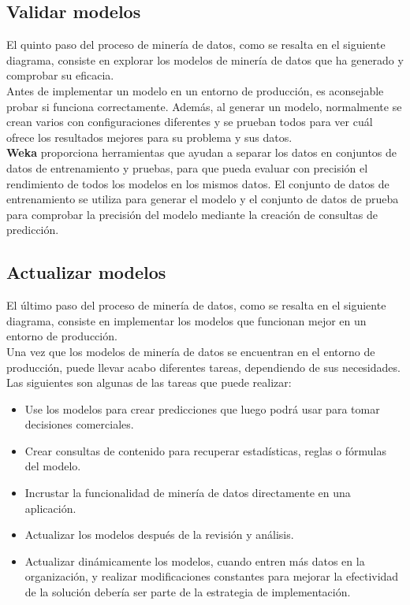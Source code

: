 \documentclass[a4paper, 11pt]{article} %
\begin{document}
\subsection*{Validar modelos}

El quinto paso del proceso de minería de datos, como se resalta en el siguiente diagrama, consiste en explorar los modelos de minería de datos que ha generado y comprobar su eficacia.\\

Antes de implementar un modelo en un entorno de producción, es aconsejable probar si funciona correctamente. Además, al generar un modelo, normalmente se crean varios con configuraciones diferentes y se prueban todos para ver cuál ofrece los resultados mejores para su problema y sus datos.\\

\textbf{Weka} proporciona herramientas que ayudan a separar los datos en conjuntos de datos de entrenamiento y pruebas, para que pueda evaluar con precisión el rendimiento de todos los modelos en los mismos datos. El conjunto de datos de entrenamiento se utiliza para generar el modelo y el conjunto de datos de prueba para comprobar la precisión del modelo mediante la creación de consultas de predicción. 

\subsection*{Actualizar modelos}

El último paso del proceso de minería de datos, como se resalta en el siguiente diagrama, consiste en implementar los modelos que funcionan mejor en un entorno de producción.\\

Una vez que los modelos de minería de datos se encuentran en el entorno de producción, puede llevar acabo diferentes tareas, dependiendo de sus necesidades. Las siguientes son algunas de las tareas que puede realizar:

\begin{itemize}
\item Use los modelos para crear predicciones que luego podrá usar para tomar decisiones comerciales.
\item Crear consultas de contenido para recuperar estadísticas, reglas o fórmulas del modelo.
\item Incrustar la funcionalidad de minería de datos directamente en una aplicación. 
\item Actualizar los modelos después de la revisión y análisis.
\item Actualizar dinámicamente los modelos, cuando entren más datos en la organización, y realizar modificaciones constantes para mejorar la efectividad de la solución debería ser parte de la estrategia de implementación.
\end{itemize}
\end{document}
